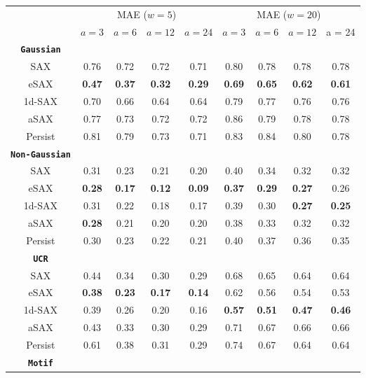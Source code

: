 \begin{table}[H]
\centering
\begin{tabular}{ccccccccc} 
\toprule
& \multicolumn{4}{c}{\ac{MAE} ($w = 5$)} & \multicolumn{4}{c}{\ac{MAE} ($w = 20$)} \\
\cmidrule(lr){2-5} \cmidrule(lr){6-9}
& $a = 3$ & $a = 6$ & $a = 12$ & $a = 24$ & $a = 3$ & $a = 6$ & $a = 12$ & a = 24 \\
\midrule
\textbf{\texttt{Gaussian}} &  &  &  & \\
\ac{SAX} & 0.76 & 0.72 & 0.72 & 0.71 & 0.80 & 0.78 & 0.78 & 0.78 \\
\ac{eSAX} & \textbf{0.47} & \textbf{0.37} & \textbf{0.32} & \textbf{0.29} & \textbf{0.69} & \textbf{0.65} & \textbf{0.62} & \textbf{0.61} \\
\ac{1d-SAX} & 0.70 & 0.66 & 0.64 & 0.64 & 0.79 & 0.77 & 0.76 & 0.76 \\
\ac{aSAX} & 0.77 & 0.73 & 0.72 & 0.72 & 0.86 & 0.79 & 0.78 & 0.78 \\
Persist & 0.81 & 0.79 & 0.73 & 0.71 & 0.83 & 0.84 & 0.80 & 0.78 \\
\midrule
\textbf{\texttt{Non-Gaussian}} &  &  &  & \\
\ac{SAX} & 0.31 & 0.23 & 0.21 & 0.20 & 0.40 & 0.34 & 0.32 & 0.32 \\
\ac{eSAX} & \textbf{0.28} & \textbf{0.17} & \textbf{0.12} & \textbf{0.09} & \textbf{0.37} & \textbf{0.29} & \textbf{0.27} & 0.26 \\
\ac{1d-SAX} & 0.31 & 0.22 & 0.18 & 0.17 & 0.39 & 0.30 & \textbf{0.27} & \textbf{0.25} \\
\ac{aSAX} & \textbf{0.28} & 0.21 & 0.20 & 0.20 & 0.38 & 0.33 & 0.32 & 0.32 \\
Persist & 0.30 & 0.23 & 0.22 & 0.21 & 0.40 & 0.37 & 0.36 & 0.35 \\
\midrule
\textbf{\texttt{UCR}} &  &  &  & \\
\ac{SAX} & 0.44 & 0.34 & 0.30 & 0.29 & 0.68 & 0.65 & 0.64 & 0.64 \\
\ac{eSAX} & \textbf{0.38} & \textbf{0.23} & \textbf{0.17} & \textbf{0.14} & 0.62 & 0.56 & 0.54 & 0.53 \\
\ac{1d-SAX} & 0.39 & 0.26 & 0.20 & 0.16 & \textbf{0.57} & \textbf{0.51} & \textbf{0.47} & \textbf{0.46} \\
\ac{aSAX} & 0.43 & 0.33 & 0.30 & 0.29 & 0.71 & 0.67 & 0.66 & 0.66 \\
Persist & 0.61 & 0.38 & 0.31 & 0.29 & 0.74 & 0.67 & 0.64 & 0.64 \\
\midrule
\textbf{\texttt{Motif}} &  &  &  & \\

\end{tabular}
\end{table}
